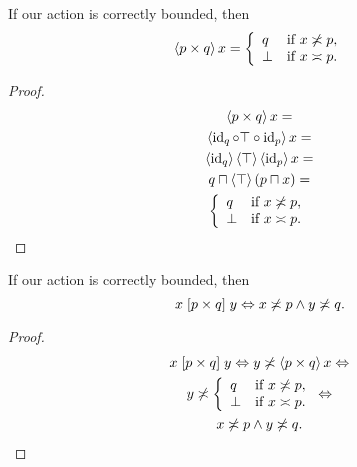 \begin{thm}
If our action is correctly bounded, then
\[
\left\langle p\times q\right\rangle x =
\left\{\begin{array}{ll}q&\text{if }x\not\asymp p,\\\bot&\text{if }x\asymp p.\end{array}\right.
\]
\end{thm}

\begin{proof}
\begin{multline*}
\left\langle p\times q\right\rangle x = \\
\left\langle \operatorname{id}_q\circ\top\circ\operatorname{id}_p\right\rangle x = \\
\left\langle \operatorname{id}_q\right\rangle\left\langle \top\right\rangle\left\langle \operatorname{id}_p\right\rangle x = \\
q\sqcap\left\langle \top\right\rangle(p\sqcap x) = \\
\left\{\begin{array}{ll}q&\text{if }x\not\asymp p,\\\bot&\text{if }x\asymp p.\end{array}\right.
\end{multline*}
\end{proof}

% 
% 

\begin{thm}
If our action is correctly bounded, then
\[ x\mathrel{\left[p\times q\right]}y\Leftrightarrow x\not\asymp p\land y\not\asymp q. \]
\end{thm}

\begin{proof}
\begin{multline*}
x\mathrel{\left[p\times q\right]}y \Leftrightarrow
y\not\asymp\left\langle p\times q\right\rangle x \Leftrightarrow \\
y\not\asymp
\left\{\begin{array}{ll}q&\text{if }x\not\asymp p,\\\bot&\text{if }x\asymp p.\end{array}\right. \Leftrightarrow \\
x\not\asymp p\land y\not\asymp q.
\end{multline*}
\end{proof}

